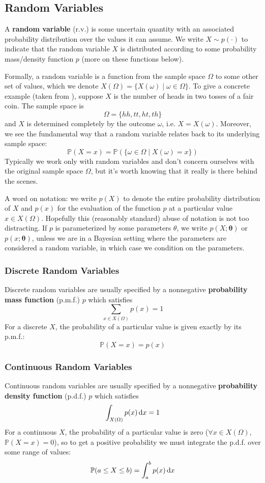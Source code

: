 \documentclass{article}
\renewcommand{\vec}[1]{\mathbf{#1}}
\newcommand{\pr}[1]{\mathbb{P}(#1)}
\newcommand{\term}[1]{\textbf{#1}}
\begin{document}
\subsection{Random Variables}
A \term{random variable} (r.v.) is some uncertain quantity with an associated probability distribution over the values it can assume. We write $X \sim p(\cdot)$ to indicate that the random variable $X$ is distributed according to some probability mass/density function $p$ (more on these functions below).

Formally, a random variable is a function from the sample space $\Omega$ to some other set of values, which we denote $X(\Omega) = \{X(\omega) \mid \omega \in \Omega\}$. To give a concrete example (taken from \cite{pitman}), suppose $X$ is the number of heads in two tosses of a fair coin. The sample space is
\[\Omega = \{hh, tt, ht, th\}\]
and $X$ is determined completely by the outcome $\omega$, i.e. $X = X(\omega)$. Moreover, we see the fundamental way that a random variable relates back to its underlying sample space:
\[\pr{X = x} = \pr{\{\omega \in \Omega \mid X(\omega) = x\}}\]
Typically we work only with random variables and don't concern ourselves with the original sample space $\Omega$, but it's worth knowing that it really is there behind the scenes.

A word on notation: we write $p(X)$ to denote the entire probability distribution of $X$ and $p(x)$ for the evaluation of the function $p$ at a particular value $x \in X(\Omega)$. Hopefully this (reasonably standard) abuse of notation is not too distracting. If $p$ is parameterized by some parameters $\theta$, we write $p(X; \vec{\theta})$ or $p(x; \vec{\theta})$, unless we are in a Bayesian setting where the parameters are considered a random variable, in which case we condition on the parameters.

\subsubsection{Discrete Random Variables}
Discrete random variables are usually specified by a nonnegative \term{probability mass function} (p.m.f.) $p$ which satisfies
\[\sum_{x \in X(\Omega)} p(x) = 1\]
For a discrete $X$, the probability of a particular value is given exactly by its p.m.f.:
\[\pr{X = x} = p(x)\]

\subsubsection{Continuous Random Variables}
Continuous random variables are usually specified by a nonnegative \term{probability density function} (p.d.f.) $p$ which satisfies
\[\int_{X(\Omega)} p(x) \dif{x} = 1\]
For a continuous $X$, the probability of a particular value is zero ($\forall x \in X(\Omega)$, $\pr{X = x} = 0$), so to get a positive probability we must integrate the p.d.f. over some range of values:
\[\pr{a \leq X \leq b} = \int_a^b p(x)\dif{x}\]
\end{document}
